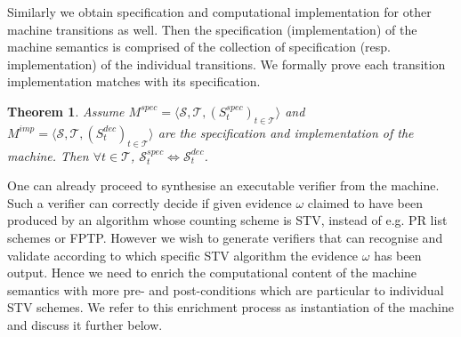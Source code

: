 \documentclass[10pt,conference]{IEEEtran}
\newtheorem{theorem}{Theorem}
\begin{document}
Similarly  
we obtain specification and computational implementation for other machine transitions as well. Then the specification (implementation) of the machine semantics is comprised of the collection of specification (resp. implementation) of the individual transitions. We formally prove 
each transition implementation  matches with its specification.
\begin{theorem}
Assume $M^{spec} = \langle \mathcal{S}, \mathcal{T}, (S_{t}^{spec})_{t \in \mathcal{T}} \rangle$ and $M^{imp} = \langle \mathcal{S}, \mathcal{T}, (S_{t}^{dec})_{t \in \mathcal{T}} \rangle$ are the specification and  implementation of the machine. Then  $\forall t\in\mathcal{T}$,  $\mathcal{S}_{t}^{spec}\Leftrightarrow\mathcal{S}_{t}^{dec}$.      
\end{theorem}

One can already proceed to synthesise an executable verifier from the machine. Such a verifier can correctly decide if given evidence $\omega$ claimed to have been produced by an algorithm whose counting scheme is STV, instead of e.g. PR list schemes or FPTP.  
However we wish to generate verifiers that can recognise and validate according to which specific STV algorithm the evidence $\omega$ has been output. Hence we need to enrich the computational content of the machine semantics with more  pre- and post-conditions which are particular to individual STV schemes. We refer to this enrichment process as instantiation of the machine and discuss it further below.
\end{document}
